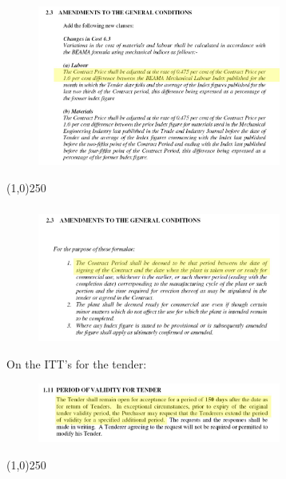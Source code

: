 \begin{frame}
\frametitle{}

\begin{figure}
	\centering
		\includegraphics[width = 8cm]{images/conammend.jpg}
	\label{fig:conammend}
\end{figure}

\end{frame}
\begin{center}\line(1,0){250}\end{center}






\begin{frame}
\frametitle{}
\begin{figure}
	\centering
		\includegraphics[width = 8cm]{images/conammend2.jpg}
	\label{fig:conammend2}
\end{figure}
On the ITT's for the tender:
\begin{figure}
	\centering
		\includegraphics[width = 8cm]{images/convalid.jpg}
	\label{fig:convalid}
\end{figure}
\end{frame}
\begin{center}\line(1,0){250}\end{center}






